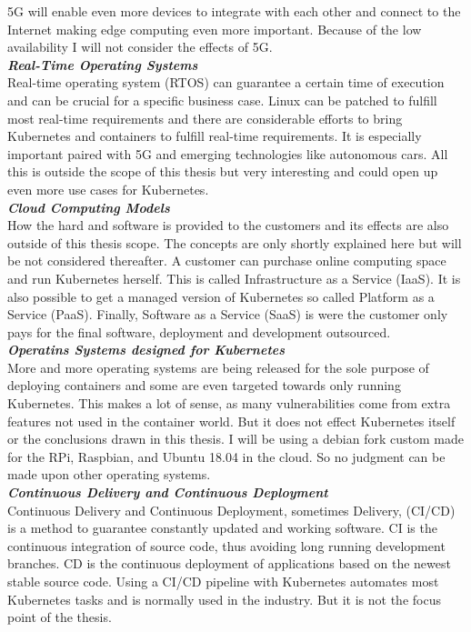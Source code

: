 5G will enable even more devices to integrate with each other and connect to the Internet making edge computing even more important. Because of the low availability I will not consider the effects of 5G.\\[5mm]
\textbf{\textit{Real-Time Operating Systems}}\\
Real-time operating system (RTOS) can guarantee a certain time of execution and can be crucial for a specific business case. Linux can be patched to fulfill most real-time requirements and there are considerable efforts to bring Kubernetes and containers to fulfill real-time requirements. It is especially important paired with 5G and emerging technologies like autonomous cars\cite{CNCFLaunRTOSKubernetesContainers40:online}. All this is outside the scope of this thesis but very interesting and could open up even more use cases for Kubernetes.\\[5mm]
\textbf{\textit{Cloud Computing Models}}\\
How the hard and software is provided to the customers and its effects are also outside of this thesis scope. The concepts are only shortly explained here but will be not considered thereafter. A customer can purchase online computing space and run Kubernetes herself. This is called Infrastructure as a Service (IaaS). It is also possible to get a managed version of Kubernetes so called Platform as a Service (PaaS). Finally, Software as a Service (SaaS) is were the customer only pays for the final software, deployment and development outsourced.\\[5mm]
\textbf{\textit{Operatins Systems designed for Kubernetes}}\\
More and more operating systems are being released for the sole purpose of deploying containers and some are even targeted towards only running Kubernetes. This makes a lot of sense, as many vulnerabilities come from extra features not used in the container world. But it does not effect Kubernetes itself or the conclusions drawn in this thesis. I will be using a debian fork custom made for the RPi, Raspbian, and Ubuntu 18.04 in the cloud. So no judgment can be made upon other operating systems.\\[5mm]
\textbf{\textit{Continuous Delivery and Continuous Deployment}}\\
Continuous Delivery and Continuous Deployment, sometimes Delivery, (CI/CD) is a method to guarantee constantly updated and working software. CI is the continuous integration of source code, thus avoiding long running development branches. CD is the continuous deployment of applications based on the newest stable source code. Using a CI/CD pipeline with Kubernetes automates most Kubernetes tasks and is normally used in the industry. But it is not the focus point of the thesis.



